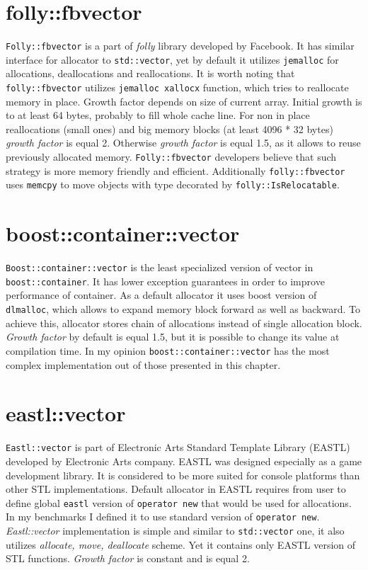 \documentclass[inz, english, shortabstract]{iithesis}
\begin{document}

\section{folly::fbvector}
{\tt Folly::fbvector}\cite{folly::fbvector_impl} is a part of \emph{folly} library developed by Facebook. It has similar interface for allocator to {\tt std::vector}, yet by default it utilizes {\tt jemalloc} for allocations, deallocations and reallocations\cite{folly::fbvector_description}. It is worth noting that {\tt folly::fbvector} utilizes {\tt jemalloc xallocx} function, which tries to reallocate memory in place. Growth factor depends on size of current array. Initial growth is to at least 64 bytes, probably to fill whole cache line. For non in place reallocations (small ones) and big memory blocks (at least 4096 * 32 bytes) \emph{growth factor} is equal 2. Otherwise \emph{growth factor} is equal 1.5, as it allows to reuse previously allocated memory. {\tt Folly::fbvector} developers believe that such strategy is more memory friendly and efficient\cite{folly::fbvector_description}. Additionally {\tt folly::fbvector} uses {\tt memcpy} to move objects with type decorated by {\tt folly::IsRelocatable}.

\section{boost::container::vector}
{\tt Boost::container::vector}\cite{boost::container::vector_impl} is the least specialized version of vector in {\tt boost::container}. It has lower exception guarantees in order to improve performance of container\cite{boost_exceptions}. As a default allocator it uses boost version of {\tt dlmalloc}\cite{dlmalloc}, which allows to expand memory block forward as well as backward. To achieve this, allocator stores chain of allocations instead of single allocation block. \emph{Growth factor} by default is equal 1.5, but it is possible to change its value at compilation time. In my opinion {\tt boost::container::vector} has the most complex implementation out of those presented in this chapter.

\section{eastl::vector}
{\tt Eastl::vector}\cite{eastl::vector_impl} is part of Electronic Arts Standard Template Library (EASTL) developed by Electronic Arts company. EASTL was designed especially as a game development library. It is considered to be more suited for console platforms\cite{eastl_faq} than other STL implementations. Default allocator in EASTL requires from user to define global {\tt eastl} version of {\tt operator new} that would be used for allocations. In my benchmarks I defined it to use standard version of {\tt operator new}. {\it Eastl::vector} implementation is simple and similar to {\tt std::vector} one, it also utilizes \emph{allocate, move, deallocate} scheme. Yet it contains only EASTL version of STL functions. \emph{Growth factor} is constant and is equal 2.  
\end{document}
